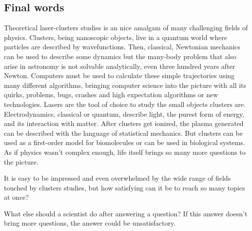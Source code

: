 \subsection{Final words}
Theoretical laser-clusters studies is an nice amalgam of many challenging
fields of physics. Clusters, being nanoscopic objects, live in a quantum world
where particles are described by wavefunctions. Then, classical, Newtonian
mechanics can be used to describe some dynamics but the many-body problem that
also arise in astronomy is not solvable analytically, even three hundred years
after Newton. Computers must be used to calculate these simple trajectories
using many different algorithms, bringing computer science into the picture
with all its quirks, problems, bugs, crashes and high expectation algorithms or
new technologies. Lasers are the tool of choice to study the small objects
clusters are. Electrodynamics, classical or quantum, describe light, the purest
form of energy, and its interaction with matter. After clusters get ionized,
the plasma generated can be described with the language of statistical mechanics.
But clusters can be used as a first-order model for biomolecules or can be used
in biological systems. As if physics wasn't complex enough, life itself brings
so many more questions to the picture.

It is easy to be impressed and even overwhelmed by the wide range of fields
touched by clusters studies, but how satisfying can it be to reach so many
topics at once?

What else should a scientist do
after answering a question? If this answer doesn't bring more questions, the
answer could be unsatisfactory.
